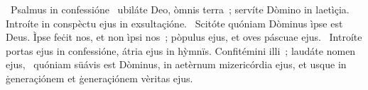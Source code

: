 {~Psalmus in confessióne}
{%
~ubiláte Deo, òmnis terra~; servíte Dòmino in laetìçia. Introíte in conspèctu ejus in exsultaçióne.
~Scitóte quóniam Dòminus ìpse est Deus. Ìpse feċit nos, et non ìpsi nos~; pòpulus ejus, et oves páscuae ejus.
~Introíte portas ejus in confessióne, átria ejus in hỳmnïs. Confitémini illi~; laudáte nomen ejus,
~quóniam süávis est Dòminus, in aetèrnum mizericórdia ejus, et usque in ġeneraçiónem et ġeneraçiónem vèritas ejus.}

